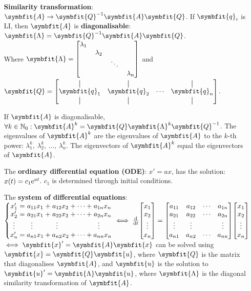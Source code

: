 \documentclass{article}
\begin{document}
\noindent \textbf{Similarity transformation}: 
$\symbfit{A}\rightarrow \symbfit{Q}^{-1}\symbfit{A}\symbfit{Q}$. If 
$\symbfit{q}_i$ is LI, then $\symbfit{A}$ is 
\textbf{diagonalisable}: $\symbfit{\Lambda}=\symbfit{Q}^{-1}\symbfit{A}\symbfit{Q}$. \\
Where $\symbfit{\Lambda}=\mqty[\dmat{\lambda_1,\: \lambda_2,\: \ddots,\: \lambda_n}]$ 
and 
$\symbfit{Q}=\mqty[\vertbar & \vertbar & & \vertbar \\ \symbfit{q}_1 & 
\symbfit{q}_2 & \cdots & \symbfit{q}_n \\ \vertbar & \vertbar & & \vertbar]$.

\noindent If $\symbfit{A}$ is diagonalisable, 
$\forall k \in \mathbb{N}_0:\symbfit{A}^k = \symbfit{Q} \symbfit{\Lambda}^k \symbfit{Q}^{-1}$. 
The eigenvalues of $\symbfit{A}^k$ are the eigenvalues of $\symbfit{A}$ 
to the $k$-th power: $\lambda_1^k,\: \lambda_2^k,\: \dots,\: \lambda_n^k$. 
The eigenvectors of $\symbfit{A}^k$ equal the eigenvectors of $\symbfit{A}$.

\noindent The \textbf{ordinary differential equation (ODE)}: $x' = a x$, 
has the solution: $x(t) = c_1 \mathrm{e}^{a t}$. $c_1$ is determined through 
initial conditions.

\noindent The \textbf{system of differential equations}: $
\left\{
	\setlength\arraycolsep{0pt}
	\begin{array}{ c >{{}}c<{{}} c >{{}}c<{{}} c >{{}}c<{{}} c >{{}}c<{{}} c  }
	x'_1               &=& a_{11}x_1                         &+& a_{12}x_2                         &+& \cdots &+& a_{1n}x_n \\
	x'_2               &=& a_{21}x_1                         &+& a_{22}x_2                         &+& \cdots &+& a_{2n}x_n \\
	\vdotswithin{x'_3} & & \vdotswithin{a_{31}}\phantom{x_1} & & \vdotswithin{a_{32}}\phantom{x_2} & &        & & \vdotswithin{a_{3n}}\phantom{x_n} \\ 
	x'_n               &=& a_{n1}x_1                         &+& a_{n2}x_2                         &+& \cdots &+& a_{nn}x_n 
	\end{array}
\right. \iff 
\dv{t}\mqty[x_1 \\ x_2 \\ \vdots \\ x_n] = \mqty[
	a_{11} & a_{12} & \cdots & a_{1n} \\
	a_{21} & a_{22} & \cdots & a_{2n} \\
	\vdots & \vdots &        & \vdots \\
	a_{n1} & a_{n2} & \cdots & a_{nn}
] \mqty[x_1 \\ x_2 \\ \vdots \\ x_n]$ $\iff \symbfit{x}' = \symbfit{A} \symbfit{x}$ 
can be solved using $\symbfit{x}=\symbfit{Q}\symbfit{u}$, where 
$\symbfit{Q}$ is the matrix that diagonalises $\symbfit{A}$, and 
$\symbfit{u}$ is the solution to 
$\symbfit{u}' = \symbfit{\Lambda} \symbfit{u}$, where 
$\symbfit{\Lambda}$ is the diagonal similarity transformation of 
$\symbfit{A}$.
\end{document}
